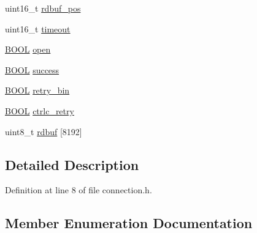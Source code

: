 \begin{DoxyCompactItemize}
\begin{tabbing}
\end{tabbing}\item 
uint16\+\_\+t \hyperlink{structconnection_a29724ccd4546e85e7f3a729236694fc6}{rdbuf\+\_\+pos}
\item 
uint16\+\_\+t \hyperlink{structconnection_a7f1ad43d3bf79b40bc39dbb5a6c3a5ae}{timeout}
\item 
\hyperlink{loader_2src_2headers_2includes_8h_af492d2bddcb2befacb3aa03dcdf9aafd}{B\+O\+OL} \hyperlink{structconnection_a052959388a3bbdb746f83ecd99c2faf7}{open}
\item 
\hyperlink{loader_2src_2headers_2includes_8h_af492d2bddcb2befacb3aa03dcdf9aafd}{B\+O\+OL} \hyperlink{structconnection_ac4403be70190235a7adbfb00e7b2e656}{success}
\item 
\hyperlink{loader_2src_2headers_2includes_8h_af492d2bddcb2befacb3aa03dcdf9aafd}{B\+O\+OL} \hyperlink{structconnection_a589462cfe27c04b6a09ff7ef2d8cf35d}{retry\+\_\+bin}
\item 
\hyperlink{loader_2src_2headers_2includes_8h_af492d2bddcb2befacb3aa03dcdf9aafd}{B\+O\+OL} \hyperlink{structconnection_aef6f6bfbc341950b4e7b75700dfaaee8}{ctrlc\+\_\+retry}
\item 
uint8\+\_\+t \hyperlink{structconnection_a5ef1bf0cfdcd46839f0cfa90ca3c76df}{rdbuf} \mbox{[}8192\mbox{]}
\end{DoxyCompactItemize}


\subsection{Detailed Description}


Definition at line 8 of file connection.\+h.



\subsection{Member Enumeration Documentation}
